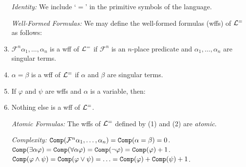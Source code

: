 \documentclass[a4paper, 11pt]{article} %
\begin{document}
\begin{enumerate}
  \item[\it Identity:] We include `$=$' in the primitive symbols of the language.
  \item[\it Well-Formed Formulas:] We may define the well-formed formulas (wffs) of $\mathcal{L}^=$ as follows:
  \item $\mathcal{F}^n\alpha_1,\ldots,\alpha_n$ is a wff of $\mathcal{L}^=$ if $\mathcal{F}^n$ is an $n$-place predicate and $\alpha_1,\ldots,\alpha_n$ are singular terms.
  \item $\alpha=\beta$ is a wff of $\mathcal{L}^=$ if $\alpha$ and $\beta$ are singular terms.
  \item If $\varphi$ and $\psi$ are wffs and $\alpha$ is a variable, then:
    \begin{itemize}
    \end{itemize}
  \vspace{-.2in}
  \item Nothing else is a wff of $\mathcal{L}^=$.
  \vspace{.1in}
  \item[\it Atomic Formulas:] The wffs of $\mathcal{L}^=$ defined by (1) and (2) are \textit{atomic}.
  \item[\it Complexity:] $\texttt{Comp}(\mathcal{F}^n\alpha_1,\ldots,\alpha_n)=\texttt{Comp}(\alpha=\beta)=0$.\\
    $\texttt{Comp}(\exists\alpha\varphi)=\texttt{Comp}(\forall\alpha\varphi)=\texttt{Comp}(\neg\varphi)=\texttt{Comp}(\varphi)+1$.\\
    $\texttt{Comp}(\varphi\wedge\psi)=\texttt{Comp}(\varphi\vee\psi)=\ldots=\texttt{Comp}(\varphi)+\texttt{Comp}(\psi)+1$.\\
\end{enumerate}
\end{document}
